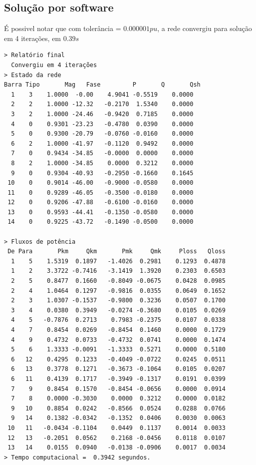 \subsection{Solução por software}
É possivel notar que com tolerância = $0.000001pu$, a rede convergiu para solução em 4 iterações, em $0.39s$
\begin{verbatim}
> Relatório final
  Convergiu em 4 iterações
> Estado da rede
Barra Tipo       Mag   Fase         P       Q       Qsh
  1    3    1.0000  -0.00    4.9041 -0.5519    0.0000 
  2    2    1.0000 -12.32   -0.2170  1.5340    0.0000 
  3    2    1.0000 -24.46   -0.9420  0.7185    0.0000 
  4    0    0.9301 -23.23   -0.4780  0.0390    0.0000 
  5    0    0.9300 -20.79   -0.0760 -0.0160    0.0000 
  6    2    1.0000 -41.97   -0.1120  0.9492    0.0000 
  7    0    0.9434 -34.85   -0.0000  0.0000    0.0000 
  8    2    1.0000 -34.85    0.0000  0.3212    0.0000 
  9    0    0.9304 -40.93   -0.2950 -0.1660    0.1645 
 10    0    0.9014 -46.00   -0.9000 -0.0580    0.0000 
 11    0    0.9289 -46.05   -0.3500 -0.0180    0.0000 
 12    0    0.9206 -47.88   -0.6100 -0.0160    0.0000 
 13    0    0.9593 -44.41   -0.1350 -0.0580    0.0000 
 14    0    0.9225 -43.72   -0.1490 -0.0500    0.0000 

> Fluxos de potência
 De Para       Pkm     Qkm       Pmk     Qmk     Ploss   Qloss
  1    5    1.5319  0.1897   -1.4026  0.2981    0.1293  0.4878
  1    2    3.3722 -0.7416   -3.1419  1.3920    0.2303  0.6503
  2    5    0.8477  0.1660   -0.8049 -0.0675    0.0428  0.0985
  2    4    1.0464  0.1297   -0.9816  0.0355    0.0649  0.1652
  2    3    1.0307 -0.1537   -0.9800  0.3236    0.0507  0.1700
  3    4    0.0380  0.3949   -0.0274 -0.3680    0.0105  0.0269
  4    5   -0.7876  0.2713    0.7983 -0.2375    0.0107  0.0338
  4    7    0.8454  0.0269   -0.8454  0.1460    0.0000  0.1729
  4    9    0.4732  0.0733   -0.4732  0.0741    0.0000  0.1474
  5    6    1.3333 -0.0091   -1.3333  0.5271    0.0000  0.5180
  6   12    0.4295  0.1233   -0.4049 -0.0722    0.0245  0.0511
  6   13    0.3778  0.1271   -0.3673 -0.1064    0.0105  0.0207
  6   11    0.4139  0.1717   -0.3949 -0.1317    0.0191  0.0399
  7    9    0.8454  0.1570   -0.8454 -0.0656    0.0000  0.0914
  7    8    0.0000 -0.3030    0.0000  0.3212    0.0000  0.0182
  9   10    0.8854  0.0242   -0.8566  0.0524    0.0288  0.0766
  9   14    0.1382 -0.0342   -0.1352  0.0406    0.0030  0.0063
 10   11   -0.0434 -0.1104    0.0449  0.1137    0.0014  0.0033
 12   13   -0.2051  0.0562    0.2168 -0.0456    0.0118  0.0107
 13   14    0.0155  0.0940   -0.0138 -0.0906    0.0017  0.0034
> Tempo computacional =  0.3942 segundos.
\end{verbatim}


